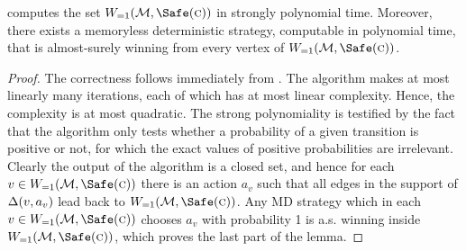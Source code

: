 \begin{theorem}
\label{5-thm:safety-main}
 computes the set $\winAS(\mdp,\Safe(\genColour))$ in strongly polynomial time. Moreover, there exists a memoryless deterministic strategy, computable in polynomial time, that is almost-surely winning from every vertex of $\winAS(\mdp,\Safe(\genColour))$.
\end{theorem}
\begin{proof}
The correctness follows immediately from . The algorithm makes at most linearly many iterations, each of which has at most linear complexity. Hence, the complexity is at most quadratic. The strong polynomiality is testified by the fact that the algorithm only tests whether a 
probability of a given transition is positive or not, for which the exact 
values of positive probabilities are irrelevant. Clearly the output of the algorithm is a closed set, and hence for each $ v\in  \winAS(\mdp,\Safe(\genColour))$ there is an action $ a_v $ such that all edges in the support of $ \Delta(v,a_v)  $ lead back to $ \winAS(\mdp,\Safe(\genColour)) $. Any MD strategy which in each $ v\in  \winAS(\mdp,\Safe(\genColour)) $ chooses $ a_v $ with probability 1 is a.s. winning inside $ \winAS(\mdp,\Safe(\genColour)) $, which proves the last part of the lemma.
\end{proof}




\begin{algorithm}
$W \leftarrow \vertices$ \;	
	$W \leftarrow \winAS(\mdp_W,\Safe(W \setminus Z))$} %
}

\Return{$W$} \tcp*{A positive winning strategy in $\mdp_W$ is now almost-surely winning from $W$ in $\mdp$.}
\caption{An algorithm computing $\winAS(\mdp,\Reach(\genColour))$}
\label{5-algo:reach-as}
\end{algorithm}

